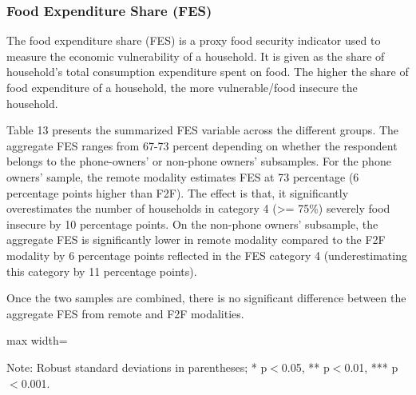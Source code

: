 \documentclass[11pt,harvard]{article}
\begin{document}
	
	\subsubsection{Food Expenditure Share (FES)}
	
	The food expenditure share (FES) is a proxy food security indicator used to measure the economic vulnerability of a household. It is given as the share of household's total consumption expenditure spent on food. The higher the share of food expenditure of a household, the more vulnerable/food insecure the household.
	
	Table 13 presents the summarized FES variable across the different groups. The aggregate FES ranges from 67-73 percent depending on whether the respondent belongs to the phone-owners' or non-phone owners' subsamples. For the phone owners' sample, the remote modality estimates FES at 73  percentage (6 percentage points higher than F2F). The effect is that, it significantly overestimates the number of households in category 4 (>= 75\%) severely food insecure by 10 percentage points. On the non-phone owners' subsample, the aggregate FES is significantly lower in remote modality compared to the F2F modality by 6 percentage points reflected in the FES category 4 (underestimating this category by 11 percentage points).
	
	Once the two samples are combined, there is no significant difference between the aggregate FES from remote and F2F modalities.  
	
	\begin{table}[htbp]
		\centering
		\begin{adjustbox}{max width=\textwidth}
			\begin{threeparttable}
				\caption{Impact of Survey Modality on Expenditure and Food Expenditure Share}
				\scriptsize
				 
				\label{tab:FES_Modality_BF}
				\begin{tablenotes}
					\item Note: Robust standard deviations in parentheses; * p$<$0.05, ** p$<$0.01, *** p$<$0.001.
				\end{tablenotes}
			\end{threeparttable}
		\end{adjustbox}
	\end{table}
	
	
\end{document}
